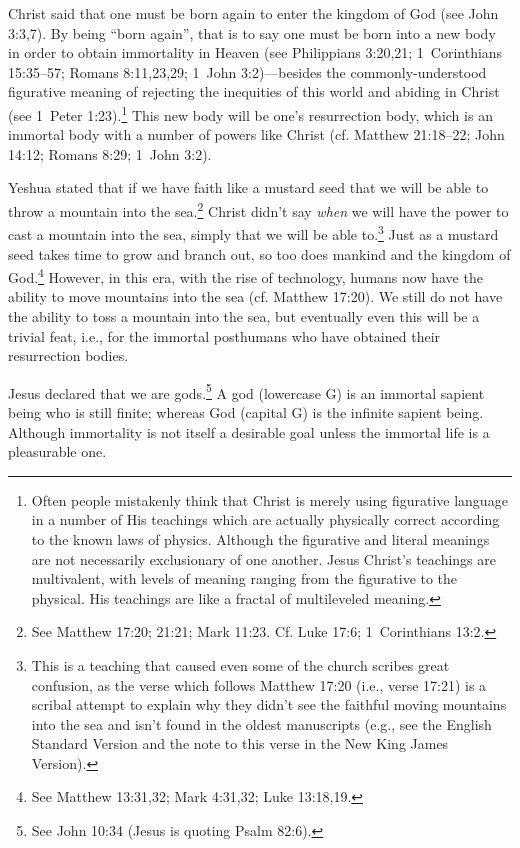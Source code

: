 \documentclass[letterpaper,12pt]{article}
\begin{document}
Christ said that one must be born again to enter the kingdom of God (see John 3:3,7). By being ``born again'', that is to say one must be born into a new body in order to obtain immortality in Heaven (see Philippians 3:20,21; 1~Corinthians 15:35--57; Romans 8:11,23,29; 1~John 3:2)---besides the commonly-understood figurative meaning of rejecting the inequities of this world and abiding in Christ (see 1~Peter 1:23).\footnote{Often people mistakenly think that Christ is merely using figurative language in a number of His teachings which are actually physically correct according to the known laws of physics. Although the figurative and literal meanings are not necessarily exclusionary of one another. Jesus Christ's teachings are multivalent, with levels of meaning ranging from the figurative to the physical. His teachings are like a fractal of multileveled meaning.} This new body will be one's resurrection body, which is an immortal body with a number of powers like Christ (cf. Matthew 21:18--22; John 14:12; Romans 8:29; 1~John 3:2).

Yeshua stated that if we have faith like a mustard seed that we will be able to throw a mountain into the sea.\footnote{See Matthew 17:20; 21:21; Mark 11:23. Cf. Luke 17:6; 1~Corinthians 13:2.} Christ didn't say \emph{when} we will have the power to cast a mountain into the sea, simply that we will be able to.\footnote{This is a teaching that caused even some of the church scribes great confusion, as the verse which follows Matthew 17:20 (i.e., verse 17:21) is a scribal attempt to explain why they didn't see the faithful moving mountains into the sea and isn't found in the oldest manuscripts (e.g., see the English Standard Version and the note to this verse in the New King James Version).} Just as a mustard seed takes time to grow and branch out, so too does mankind and the kingdom of God.\footnote{See Matthew 13:31,32; Mark 4:31,32; Luke 13:18,19.} However, in this era, with the rise of technology, humans now have the ability to move mountains into the sea (cf. Matthew 17:20). We still do not have the ability to toss a mountain into the sea, but eventually even this will be a trivial feat, i.e., for the immortal posthumans who have obtained their resurrection bodies.

Jesus declared that we are gods.\footnote{See John 10:34 (Jesus is quoting Psalm 82:6).} A god (lowercase G) is an immortal sapient being who is still finite; whereas God (capital G) is the infinite sapient being. Although immortality is not itself a desirable goal unless the immortal life is a pleasurable one.
\end{document}
